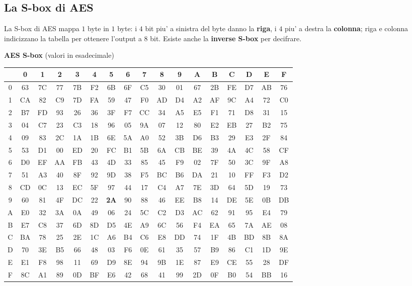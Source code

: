 \subsection{La S-box di AES}
La S-box di AES mappa $ 1 $ byte in $ 1 $ byte: i $ 4 $ bit piu' a sinistra del byte danno la \textbf{riga}, i $ 4 $ piu' a destra la \textbf{colonna}; riga e colonna indicizzano la tabella per ottenere l'output a $ 8 $ bit. Esiste anche la \textbf{inverse S-box} per decifrare.
\begin{center}
  \scriptsize
  \textbf{AES S-box} (valori in esadecimale)\\[2pt]
  \begin{tabular}{|c|*{16}{c}|}
    \hline
    & 0 & 1 & 2 & 3 & 4 & 5 & 6 & 7 & 8 & 9 & A & B & C & D & E & F \\ \hline
    0 & 63 & 7C & 77 & 7B & F2 & 6B & 6F & C5 & 30 & 01 & 67 & 2B & FE & D7 & AB & 76 \\
    1 & CA & 82 & C9 & 7D & FA & 59 & 47 & F0 & AD & D4 & A2 & AF & 9C & A4 & 72 & C0 \\
    2 & B7 & FD & 93 & 26 & 36 & 3F & F7 & CC & 34 & A5 & E5 & F1 & 71 & D8 & 31 & 15 \\
    3 & 04 & C7 & 23 & C3 & 18 & 96 & 05 & 9A & 07 & 12 & 80 & E2 & EB & 27 & B2 & 75 \\
    4 & 09 & 83 & 2C & 1A & 1B & 6E & 5A & A0 & 52 & 3B & D6 & B3 & 29 & E3 & 2F & 84 \\
    5 & 53 & D1 & 00 & ED & 20 & FC & B1 & 5B & 6A & CB & BE & 39 & 4A & 4C & 58 & CF \\
    6 & D0 & EF & AA & FB & 43 & 4D & 33 & 85 & 45 & F9 & 02 & 7F & 50 & 3C & 9F & A8 \\
    7 & 51 & A3 & 40 & 8F & 92 & 9D & 38 & F5 & BC & B6 & DA & 21 & 10 & FF & F3 & D2 \\
    8 & CD & 0C & 13 & EC & 5F & 97 & 44 & 17 & C4 & A7 & 7E & 3D & 64 & 5D & 19 & 73 \\
    9 & 60 & 81 & 4F & DC & 22 & \textbf{2A} & 90 & 88 & 46 & EE & B8 & 14 & DE & 5E & 0B & DB \\
    A & E0 & 32 & 3A & 0A & 49 & 06 & 24 & 5C & C2 & D3 & AC & 62 & 91 & 95 & E4 & 79 \\
    B & E7 & C8 & 37 & 6D & 8D & D5 & 4E & A9 & 6C & 56 & F4 & EA & 65 & 7A & AE & 08 \\
    C & BA & 78 & 25 & 2E & 1C & A6 & B4 & C6 & E8 & DD & 74 & 1F & 4B & BD & 8B & 8A \\
    D & 70 & 3E & B5 & 66 & 48 & 03 & F6 & 0E & 61 & 35 & 57 & B9 & 86 & C1 & 1D & 9E \\
    E & E1 & F8 & 98 & 11 & 69 & D9 & 8E & 94 & 9B & 1E & 87 & E9 & CE & 55 & 28 & DF \\
    F & 8C & A1 & 89 & 0D & BF & E6 & 42 & 68 & 41 & 99 & 2D & 0F & B0 & 54 & BB & 16 \\ \hline
  \end{tabular}
\end{center}

